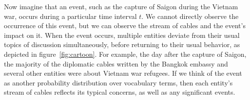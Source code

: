 Now imagine that an event, such as the capture of Saigon during the
Vietnam war, occurs during a particular time interval $t$. We cannot
directly observe the occurrence of this event, but we can observe the
stream of cables and the event's impact on it. When the event occurs,
multiple entities deviate from their usual topics of discussion
simultaneously, before returning to their usual behavior, as depicted
in figure~\ref{fig:cartoon}. For example, the day after the capture of
Saigon, the majority of the diplomatic cables written by the Bangkok
embassy and several other entities were about Vietnam war refugees. If
we think of the event as another probability distribution over
vocabulary terms, then each entity's stream of cables reflects its
typical concerns, as well as any significant events.






